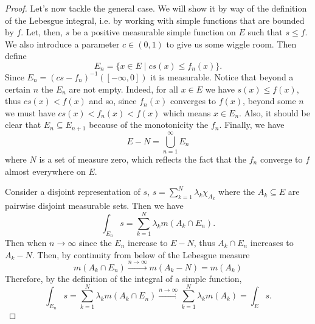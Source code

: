 \documentclass[12pt,oneside]{book}
\begin{document}
\begin{proof}
	Let's now tackle the general case. We will show it by way of the definition of the
	Lebesgue integral, i.e. by working with simple functions that are bounded by \( f \).
	Let, then, \( s \) be a positive measurable simple function on \( E \) such that \( s
	\leq f \). We also introduce a parameter \( c \in (0,1) \) to give us some wiggle
	room. Then define
	\begin{equation*}
		E_n = \{ x \in E \mid cs(x) \leq f_n(x) \}.
	\end{equation*}
	Since \( E_n = (cs - f_n)^{-1}([-\infty, 0]) \) it is measurable.	Notice that beyond a
	certain \( n \) the \( E_n \) are not empty. Indeed, for all \(
	x \in E\) we have \( s(x)	\leq f(x) \), thus \( cs(x) < f(x) \) and so, since \(
	f_n(x) \) converges to \(	f(x) \), beyond some \( n \) we must have \( cs(x) < f_n(x) <
	f(x) \) which means \( x \in E_n \). Also, it should be clear	that \( E_n \subseteq
	E_{n+1} \) because of the	monotonicity the \( f_n \). Finally, we have
	\begin{equation*}
		E - N = \bigcup_{n = 1}^\infty E_n
	\end{equation*}
	where \( N \) is a set of measure zero, which reflects the fact that the \( f_n \)
	converge to \( f \) almost everywhere on \( E \).

	Consider a disjoint representation of \( s \), \( s = \sum_{k = 1}^{N} \lambda_k
	\chi_{A_k} \) where the \( A_k \subseteq E \) are pairwise disjoint measurable sets.
	Then we have
	\begin{equation*}
		\int_{E_n} s = \sum_{k = 1}^{N} \lambda_k m(A_k \cap E_n). 
	\end{equation*}
	Then when \( n \to \infty \) since the \( E_n \) increase to \( E-N \),	thus \( A_k \cap
	E_n \) increases to \( A_k - N \). Then, by continuity from below of the Lebesgue
	measure
	\begin{equation*}
		m(A_k \cap E_n) \xrightarrow{n \to \infty} m(A_k - N) = m(A_k)
	\end{equation*}
	Therefore, by the definition of the integral of a simple function,
	\begin{equation} \label{eq:limit of simple integrals}
		\int_{E_n} s = \sum_{k = 1}^{N} \lambda_k m(A_k \cap E_n) \xrightarrow{n \to \infty} \sum_{k = 1}^{N} \lambda_k m(A_k) = \int_E s. 
	\end{equation}


\end{proof}
\end{document}
